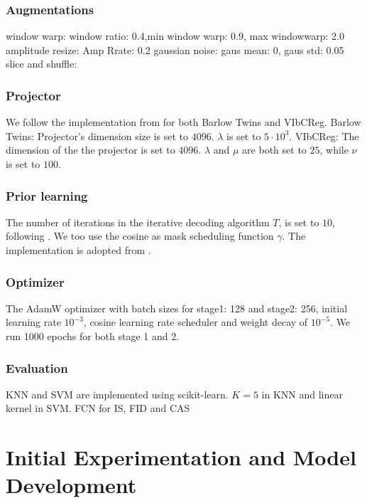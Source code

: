 \documentclass[../../thesis.tex]{subfiles}
\begin{document}
\subsubsection{Augmentations}
window warp:    window ratio: 0.4,min window warp: 0.9, max windowwarp: 2.0\newline
amplitude resize: Amp Rrate: 0.2\newline
gaussian noise: gaus mean: 0, gaus std: 0.05\newline
slice and shuffle:\newline

\subsubsection{Projector}
We follow the implementation from \cite{lee2024computer} for both Barlow Twins and VIbCReg.\newline
Barlow Twins: Projector's dimension size is set to $4096$. $\lambda$ is set to $5\cdot10^3$. \newline
VIbCReg: The dimension of the the projector is set to $4096$. $\lambda$ and $\mu$ are both set to $25$, while $\nu$ is set to $100$.

\subsubsection{Prior learning}
The number of iterations in the iterative decoding algorithm $T$, is set to $10$, following \cite{chang2022maskgit}. We too use the cosine as mask scheduling function $\gamma$. The implementation is adopted from \cite{TimeVQVAE}. 


\subsubsection{Optimizer}
The AdamW optimizer with batch sizes for stage1: 128 and stage2: 256, initial learning rate $10^{-3}$, cosine learning rate scheduler and weight decay of $10^{-5}$. We run 1000 epochs for both stage 1 and 2. 

\subsubsection{Evaluation}
KNN and SVM are implemented using scikit-learn. $K=5$ in KNN and linear kernel in SVM.\newline
FCN for IS, FID and CAS

\section{Initial Experimentation and Model Development}
\end{document}

